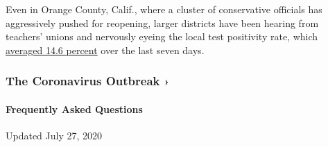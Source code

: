 Even in Orange County, Calif., where a cluster of conservative officials
has aggressively pushed for reopening, larger districts have been
hearing from teachers' unions and nervously eyeing the local test
positivity rate, which
\href{https://ochca.maps.arcgis.com/apps/opsdashboard/index.html\#/cc4859c8c522496b9f21c451de2fedae}{averaged
14.6 percent} over the last seven days.

\href{https://www.nytimes3xbfgragh.onion/news-event/coronavirus?action=click\&pgtype=Article\&state=default\&region=MAIN_CONTENT_3\&context=storylines_faq}{}

\hypertarget{the-coronavirus-outbreak-}{%
\subsubsection{The Coronavirus Outbreak
›}\label{the-coronavirus-outbreak-}}

\hypertarget{frequently-asked-questions}{%
\paragraph{Frequently Asked
Questions}\label{frequently-asked-questions}}

Updated July 27, 2020

